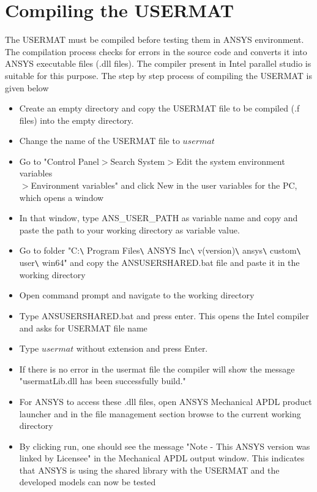 \documentclass[12pt,a4paper,twoside,openright]{report}
\begin{document}
\section{Compiling the USERMAT}
\indent\indent\indent The USERMAT must be compiled before testing them in ANSYS environment. The compilation process checks for errors in the source code and converts it into ANSYS executable files (.dll files). The compiler present in Intel parallel studio is suitable for this purpose. The step by step process of compiling the USERMAT is given below
\begin{itemize}
\item Create an empty directory and copy the USERMAT file to be compiled (.f files) into the empty directory.
\item Change the name of the USERMAT file to $usermat$
\item Go to "Control Panel$>$Search System$>$Edit the system environment variables\\$>$Environment variables" and click New in the user variables for the PC, which opens a window
\item In that window, type ANS\_USER\_PATH as variable name and copy and paste the path to your working directory as variable value.
\item Go to folder "C:\texttt{\textbackslash} Program Files\texttt{\textbackslash} ANSYS Inc\texttt{\textbackslash} v(version)\texttt{\textbackslash} ansys\texttt{\textbackslash} custom\texttt{\textbackslash} user\texttt{\textbackslash} win64" and copy the ANSUSERSHARED.bat file and paste it in the working directory
\item Open command prompt and navigate to the working directory
\item Type ANSUSERSHARED.bat and press enter. This opens the Intel compiler and asks for USERMAT file name
\item Type $usermat$ without extension and press Enter.
\item If there is no error in the usermat file the compiler will show the message "usermatLib.dll has been successfully build."  
\item For ANSYS to access these .dll files, open ANSYS Mechanical APDL product launcher and in the file management section browse to the current working directory
\item By clicking run, one should see the message "Note - This ANSYS version was linked by Licensee" in the Mechanical APDL output window. This indicates that ANSYS is using the shared library with the USERMAT and the developed models can now be tested\\
\end{itemize} 
\end{document}
